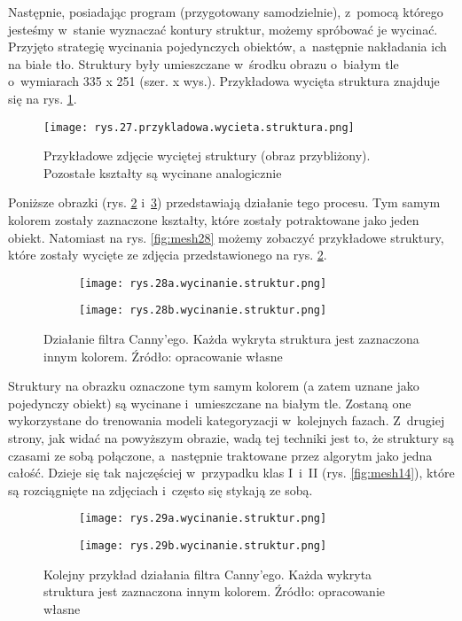 Następnie, posiadając program (przygotowany samodzielnie), z~pomocą którego jesteśmy w~stanie wyznaczać kontury struktur, możemy spróbować je wycinać. Przyjęto strategię wycinania pojedynczych obiektów, a~następnie nakładania ich na białe tło. Struktury były umieszczane w~środku obrazu o~białym tle o~wymiarach 335 x 251 (szer. x wys.). Przykładowa wycięta struktura znajduje się na rys. \ref{fig:mesh26.pojedyncza}.
\begin{figure}[h]
    \centering
    \texttt{[image: rys.27.przykladowa.wycieta.struktura.png]}
    \caption{Przykładowe zdjęcie wyciętej struktury (obraz przybliżony). Pozostałe kształty są wycinane analogicznie}
    \label{fig:mesh26.pojedyncza}
\end{figure}
Poniższe obrazki (rys. \ref{fig:mesh26} i~\ref{fig:mesh27}) przedstawiają działanie tego procesu. Tym samym kolorem zostały zaznaczone kształty, które zostały potraktowane jako jeden obiekt. Natomiast na rys. \ref{fig:mesh28} możemy zobaczyć przykładowe struktury, które zostały wycięte ze zdjęcia przedstawionego na rys. \ref{fig:mesh26}. 
\begin{figure}[h]
	\centering
	\begin{subfigure}{0.29\textwidth}
	    \centering
	    \texttt{[image: rys.28a.wycinanie.struktur.png]}
	\end{subfigure}
	\begin{subfigure}{0.29\textwidth}
	    \centering
	    \texttt{[image: rys.28b.wycinanie.struktur.png]}
	\end{subfigure}
	\caption{\label{fig:mesh26}Działanie filtra Canny'ego. Każda wykryta struktura jest zaznaczona innym kolorem. Źródło: opracowanie własne}
\end{figure}
Struktury na obrazku oznaczone tym samym kolorem (a zatem uznane jako pojedynczy obiekt) są wycinane i~umieszczane na białym tle. Zostaną one wykorzystane do trenowania modeli kategoryzacji w~kolejnych fazach. Z~drugiej strony, jak widać na powyższym obrazie, wadą tej techniki jest to, że struktury są czasami ze sobą połączone, a~następnie traktowane przez algorytm jako jedna całość. Dzieje się tak najczęściej w~przypadku klas I~i~II (rys. \ref{fig:mesh14}), które są rozciągnięte na zdjęciach i~często się stykają ze sobą. 
\begin{figure}[h]
	\centering
	\begin{subfigure}{0.29\textwidth}
	    \centering
	    \texttt{[image: rys.29a.wycinanie.struktur.png]}
	\end{subfigure}
	\begin{subfigure}{0.29\textwidth}
	    \centering
	    \texttt{[image: rys.29b.wycinanie.struktur.png]}
	\end{subfigure}
	\caption{\label{fig:mesh27}Kolejny przykład działania filtra Canny'ego. Każda wykryta struktura jest zaznaczona innym kolorem. Źródło: opracowanie własne}
\end{figure}
